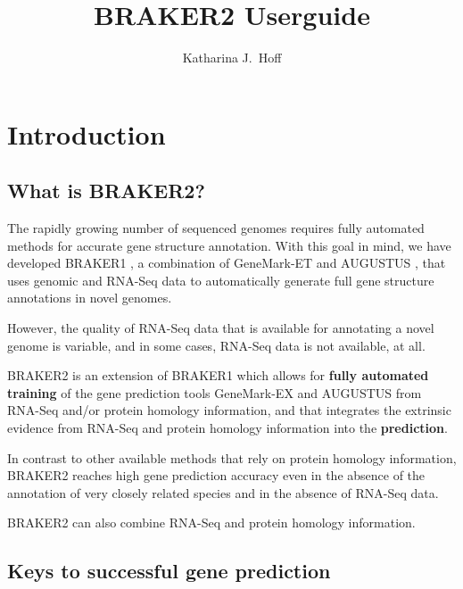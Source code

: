 \documentclass[a4paper,10pt]{report}
\title{BRAKER2 Userguide}
\author{Katharina J.~Hoff}
\begin{document}
\maketitle

\tableofcontents

\chapter{Introduction}

\section{What is BRAKER2?}

The rapidly growing number of sequenced genomes requires fully automated methods for accurate gene structure annotation. With this goal in mind, we have developed BRAKER1 \cite{braker1}, a combination of GeneMark-ET \cite{GeneMark-ET} and AUGUSTUS \cite{AUGUSTUS}, that uses genomic and RNA-Seq data to automatically generate full gene structure annotations in novel genomes.

However, the quality of RNA-Seq data that is available for annotating a novel genome is variable, and in some cases, RNA-Seq data is not available, at all.

BRAKER2 is an extension of BRAKER1 which allows for \textbf{fully automated training} of the gene prediction tools GeneMark-EX \cite{GeneMark-EX} and AUGUSTUS from RNA-Seq and/or protein homology information, and that integrates the extrinsic evidence from RNA-Seq and protein homology information into the \textbf{prediction}.

In contrast to other available methods that rely on protein homology information, BRAKER2 reaches high gene prediction accuracy even in the absence of the annotation of very closely related species and in the absence of RNA-Seq data. 

BRAKER2 can also combine RNA-Seq and protein homology information.

\section{Keys to successful gene prediction}
\end{document}
